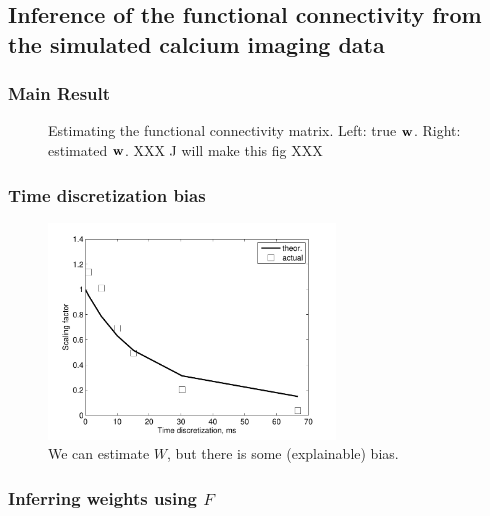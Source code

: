 \subsection{Inference of the functional connectivity from the simulated calcium imaging data} \label{sec:results:inference}

\clearpage
\subsubsection{Main Result}

\begin{figure}[h]
\caption{Estimating the functional connectivity matrix. Left: true $\mathbf{w}$.  Right: estimated $\mathbf{w}$.  XXX J will make this fig XXX}
\label{fig:w}
\end{figure}

\clearpage
\subsubsection{Time discretization bias}

\begin{figure}[h]
\centering
\includegraphics[width=3in]{../figs/Figure13_scalebiasvsframerate}
\caption{We can estimate $W$, but there is some (explainable) bias.}
\label{fig:bias}
\end{figure}

\clearpage
\subsubsection{Inferring weights using $F$}


